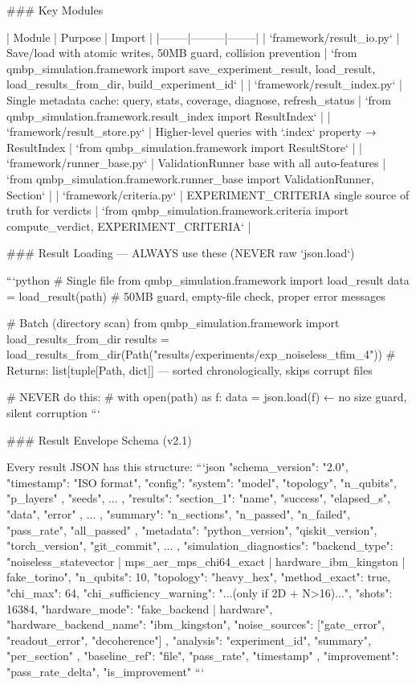 ### Key Modules

| Module | Purpose | Import |
|--------|---------|--------|
| `framework/result_io.py` | Save/load with atomic writes, 50MB guard, collision prevention | `from qmbp_simulation.framework import save_experiment_result, load_result, load_results_from_dir, build_experiment_id` |
| `framework/result_index.py` | Single metadata cache: query, stats, coverage, diagnose, refresh_status | `from qmbp_simulation.framework.result_index import ResultIndex` |
| `framework/result_store.py` | Higher-level queries with `.index` property → ResultIndex | `from qmbp_simulation.framework import ResultStore` |
| `framework/runner_base.py` | ValidationRunner base with all auto-features | `from qmbp_simulation.framework.runner_base import ValidationRunner, Section` |
| `framework/criteria.py` | EXPERIMENT_CRITERIA single source of truth for verdicts | `from qmbp_simulation.framework.criteria import compute_verdict, EXPERIMENT_CRITERIA` |

### Result Loading — ALWAYS use these (NEVER raw `json.load`)

```python
# Single file
from qmbp_simulation.framework import load_result
data = load_result(path)  # 50MB guard, empty-file check, proper error messages

# Batch (directory scan)
from qmbp_simulation.framework import load_results_from_dir
results = load_results_from_dir(Path("results/experiments/exp_noiseless_tfim_4"))
# Returns: list[tuple[Path, dict]] — sorted chronologically, skips corrupt files

# NEVER do this:
# with open(path) as f: data = json.load(f)  ← no size guard, silent corruption
```

### Result Envelope Schema (v2.1)

Every result JSON has this structure:
```json
{
  "schema_version": "2.0",
  "timestamp": "ISO format",
  "config": { "system": { "model", "topology", "n_qubits", "p_layers" }, "seeds", ... },
  "results": { "section_1": { "name", "success", "elapsed_s", "data", "error" }, ... },
  "summary": { "n_sections", "n_passed", "n_failed", "pass_rate", "all_passed" },
  "metadata": { "python_version", "qiskit_version", "torch_version", "git_commit", ... },
  "simulation_diagnostics": {
    "backend_type": "noiseless_statevector | mps_aer_mps_chi64_exact | hardware_ibm_kingston | fake_torino",
    "n_qubits": 10,
    "topology": "heavy_hex",
    "method_exact": true,
    "chi_max": 64,
    "chi_sufficiency_warning": "...(only if 2D + N>16)...",
    "shots": 16384,
    "hardware_mode": "fake_backend | hardware",
    "hardware_backend_name": "ibm_kingston",
    "noise_sources": ["gate_error", "readout_error", "decoherence"]
  },
  "analysis": { "experiment_id", "summary", "per_section" },
  "baseline_ref": { "file", "pass_rate", "timestamp" },
  "improvement": { "pass_rate_delta", "is_improvement" }
}
```

